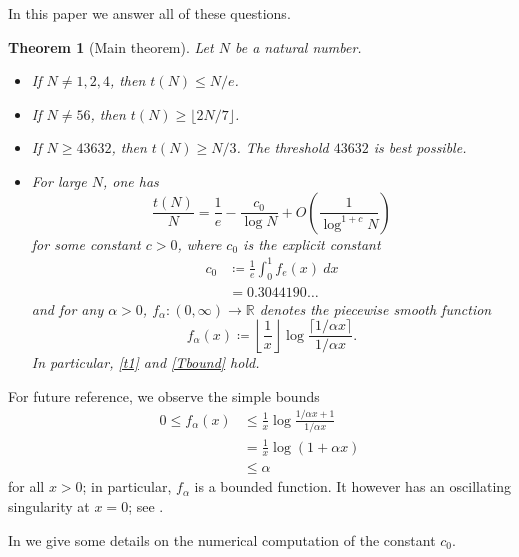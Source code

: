 \documentclass[12pt,a4paper,reqno]{amsart}
\numberwithin{equation}{section}
\theoremstyle{plain}
\newtheorem{theorem}{Theorem}[section]
\theoremstyle{definition}
\newcommand\R{\mathbb{R}}
\begin{document}
In this paper we answer all of these questions.

\begin{theorem}[Main theorem]\label{main} Let $N$ be a natural number.
\begin{itemize}
\item[(i)] If $N \neq 1,2,4$, then $t(N) \leq N/e$.
\item[(ii)]  If $N \neq 56$, then $t(N) \geq \lfloor 2N/7 \rfloor$.
\item[(iii)]  If $N \geq 43632$, then $t(N) \geq N/3$.  The threshold $43632$ is best possible.
\item[(iv)]  For large $N$, one has
  \begin{equation}\label{asym}
    \frac{t(N)}{N} = \frac{1}{e} - \frac{c_0}{\log N} + O\left( \frac{1}{\log^{1+c} N} \right)
  \end{equation}
for some constant $c>0$, where $c_0$ is the explicit constant
\begin{equation}\label{c0-def}
  \begin{split}
  c_0 &\coloneqq \frac{1}{e} \int_0^1 f_e(x)\ dx \\
  &= 0.3044190\dots
\end{split}
\end{equation}
and for any $\alpha>0$, $f_\alpha \colon (0,\infty) \to \R$ denotes the piecewise smooth function
\begin{equation}\label{falpha-def} 
  f_\alpha(x) \coloneqq \left\lfloor \frac{1}{x} \right\rfloor \log \frac{\lceil 1/\alpha x \rceil}{1/\alpha x}.
\end{equation}
In particular, \eqref{t1} and \eqref{Tbound} hold.
\end{itemize}
\end{theorem}

For future reference, we observe the simple bounds
\begin{equation}\label{falpha-bound}
 \begin{split}
   0 \leq f_\alpha(x) &\leq \frac{1}{x} \log \frac{1/\alpha x+1}{1/\alpha x}\\
&= \frac{1}{x} \log\left( 1 + \alpha x \right) \\
&\leq \alpha
\end{split}
\end{equation}
for all $x>0$; in particular, $f_\alpha$ is a bounded function.  It however has an oscillating singularity at $x=0$; see .

In  we give some details on the numerical computation of the constant $c_0$.
\end{document}
